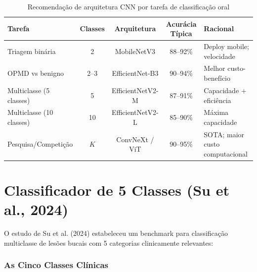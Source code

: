 \begin{table}[H]
  \centering
  \caption{Recomendação de arquitetura CNN por tarefa de classificação oral}
  \label{tab:arch-recommendation}
  \begin{tabularx}{\textwidth}{lcccX}
    \toprule
    \textbf{Tarefa} & \textbf{Classes} & \textbf{Arquitetura} & \textbf{Acurácia Típica} & \textbf{Racional} \\
    \midrule
    Triagem binária & 2 & MobileNetV3 & 88--92\% & Deploy mobile; velocidade \\
    OPMD vs benigno & 2--3 & EfficientNet-B3 & 90--94\% & Melhor custo-benefício \\
    Multiclasse (5 classes) & 5 & EfficientNetV2-M & 87--91\% & Capacidade + eficiência \\
    Multiclasse (10 classes) & 10 & EfficientNetV2-L & 85--90\% & Máxima capacidade \\
    Pesquisa/Competição & $K$ & ConvNeXt / ViT & 90--95\% & SOTA; maior custo computacional \\
    \bottomrule
  \end{tabularx}
\end{table}


\section{Classificador de 5 Classes (Su et al., 2024)}
\label{sec:classificador-5}

O estudo de Su et al. (2024) estabeleceu um benchmark para classificação
multiclasse de lesões bucais com 5 categorias clinicamente relevantes:

\subsubsection{As Cinco Classes Clínicas}

